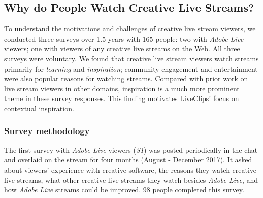 



\subsection{Why do People Watch Creative Live Streams?}
To understand the motivations and challenges of creative live stream viewers, we conducted three surveys over 1.5 years with 165 people: two with \textit{Adobe Live} viewers; one with viewers of any creative live streams on the Web. All three surveys were voluntary. We found that creative live stream viewers watch streams primarily for \textit{learning} and \textit{inspiration}; community engagement and entertainment were also popular reasons for watching streams. Compared with prior work on live stream viewers in other domains, inspiration is a much more prominent theme in these survey responses. This finding motivates LiveClips' focus on contextual inspiration.

\subsubsection{Survey methodology}
The first survey with \textit{Adobe Live} viewers (\textit{S1}) was posted periodically in the chat and overlaid on the stream for four months (August - December 2017). It asked about viewers' experience with creative software, the reasons they watch creative live streams, what other creative live streams they watch besides \textit{Adobe Live}, and how \textit{Adobe Live} streams could be improved. 98 people completed this survey.

